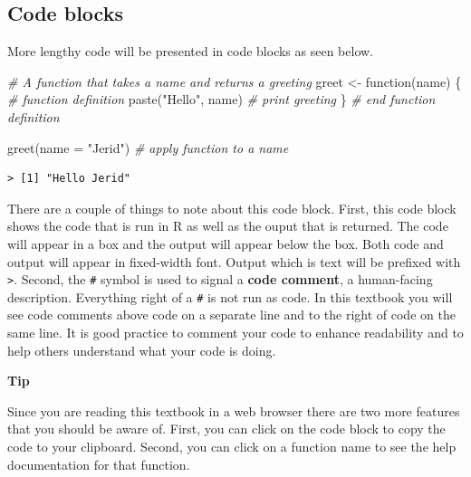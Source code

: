 \documentclass[
  letterpaper,
]{latex/krantz}
\newenvironment{Shaded}{\begin{snugshade}}{\end{snugshade}}
\newcommand{\AttributeTok}[1]{\textcolor[rgb]{0.00,0.00,0.00}{#1}}
\newcommand{\CommentTok}[1]{\textcolor[rgb]{0.00,0.00,0.00}{\textit{#1}}}
\newcommand{\ControlFlowTok}[1]{\textcolor[rgb]{0.00,0.00,0.00}{#1}}
\newcommand{\FunctionTok}[1]{\textcolor[rgb]{0.00,0.00,0.00}{#1}}
\newcommand{\NormalTok}[1]{\textcolor[rgb]{0.00,0.00,0.00}{#1}}
\newcommand{\OtherTok}[1]{\textcolor[rgb]{0.00,0.00,0.00}{#1}}
\newcommand{\StringTok}[1]{\textcolor[rgb]{0.00,0.00,0.00}{#1}}
\begin{document}
\hypertarget{code-blocks}{%
\subsection*{Code blocks}\label{code-blocks}}

More lengthy code will be presented in code blocks as seen below.

\begin{Shaded}
\begin{Highlighting}[]
\CommentTok{\# A function that takes a name and returns a greeting}
\NormalTok{greet }\OtherTok{\textless{}{-}} \ControlFlowTok{function}\NormalTok{(name) \{ }\CommentTok{\# function definition}
  \FunctionTok{paste}\NormalTok{(}\StringTok{"Hello"}\NormalTok{, name) }\CommentTok{\# print greeting}
\NormalTok{\} }\CommentTok{\# end function definition}

\FunctionTok{greet}\NormalTok{(}\AttributeTok{name =} \StringTok{"Jerid"}\NormalTok{) }\CommentTok{\# apply function to a name}
\end{Highlighting}
\end{Shaded}

\begin{verbatim}
> [1] "Hello Jerid"
\end{verbatim}

There are a couple of things to note about this code block. First, this
code block shows the code that is run in R as well as the ouput that is
returned. The code will appear in a box and the output will appear below
the box. Both code and output will appear in fixed-width font. Output
which is text will be prefixed with \texttt{\textgreater{}}. Second, the
\texttt{\#} symbol is used to signal a \textbf{code comment}, a
human-facing description. Everything right of a \texttt{\#} is not run
as code. In this textbook you will see code comments above code on a
separate line and to the right of code on the same line. It is good
practice to comment your code to enhance readability and to help others
understand what your code is doing.

\begin{tcolorbox}[enhanced jigsaw, left=2mm, arc=.35mm, colback=white, rightrule=.15mm, toprule=.15mm, breakable, leftrule=.75mm, opacityback=0, bottomrule=.15mm]

\textbf{ Tip}

Since you are reading this textbook in a web browser there are two more
features that you should be aware of. First, you can click on the code
block to copy the code to your clipboard. Second, you can click on a
function name to see the help documentation for that function.

\end{tcolorbox}
\end{document}
